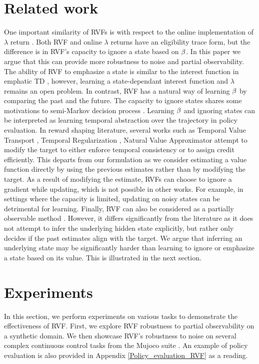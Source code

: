\section{Related work}

One important similarity of RVFs is with respect to the online implementation of $\lambda$ return \cite{sutton1998reinforcement,dayan1992convergence}. Both RVF and online $\lambda$ returns have an eligibility trace form, but the difference is in RVF's capacity to ignore a state based on $\beta$. In this paper we argue that this can provide more robustness to noise and partial observability.  The ability of RVF to emphasize a state is similar to the interest function in emphatic TD \cite{mahmood2015emphatic}, however, learning a state-dependant interest function and $\lambda$ remains an open problem. In contrast, RVF has a natural way of learning $\beta$ by comparing the past and the future. The capacity to ignore states shares some motivations to semi-Markov decision process \cite{puterman1990markov}. Learning $\beta$ and ignoring states can be interpreted as learning temporal abstraction over the trajectory in policy evaluation.
In reward shaping literature, several works such as Temporal Value Transport \cite{TVT}, Temporal Regularization \cite{thodoroff2018temporal}, Natural Value Approximator \cite{xu2017natural} attempt to modify the target to either enforce temporal consistency or to assign credit efficiently. This departs from our formulation as we consider estimating a value function directly by using the previous estimates rather than by  modifying the target. As a result of modifying the estimate, RVFs can choose to ignore a gradient while updating, which is not possible in other works. For example, in settings where the capacity is limited, updating on noisy states can be detrimental for learning.
Finally, RVF can also be considered as a partially observable method \cite{kaelbling1998planning}. However, it differs significantly from the literature as it does not attempt to infer the underlying hidden state explicitly, but rather only decides if the past estimates align with the target. We argue that inferring an underlying state may be significantly harder than learning to ignore or emphasize a state based on its value. This is illustrated in the next section.

\section{Experiments}
In this section, we perform experiments on various tasks to demonstrate the effectiveness of RVF.
First, we explore RVF robustness to partial observability on a synthetic domain. We then showcase RVF's robustness to noise on several complex continuous control tasks from the Mujoco suite \cite{todorov2012mujoco}. An example of policy evaluation is also provided in Appendix \ref{Policy_evaluation_RVF} as a reading.
